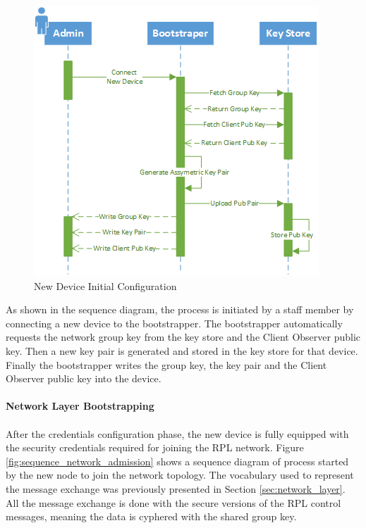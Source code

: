 \begin{figure}[h]
  \centering
  \includegraphics[width=0.8\linewidth]{figures/Sequence_Bootstrapping.png}
  \caption{New Device Initial Configuration}
  \label{fig:sequence_bootstrapping}
\end{figure}

As shown in the sequence diagram, the process is initiated by a staff member by connecting a new device to the bootstrapper. The bootstrapper automatically requests the network group key from the key store and the Client Observer public key. Then a new key pair is generated and stored in the key store for that device. Finally the bootstrapper writes the group key, the key pair and the Client Observer public key into the device.

\paragraph{\textbf{Network Layer Bootstrapping}}
\paragraph{}

After the credentials configuration phase, the new device is fully equipped with the security credentials required for joining the RPL network. Figure \ref{fig:sequence_network_admission} shows a sequence diagram of process started by the new node to join the network topology. The vocabulary used to represent the message exchange was previously presented in Section \ref{sec:network_layer}. All the message exchange is done with the secure versions of the RPL control messages, meaning the data is cyphered with the shared group key.

